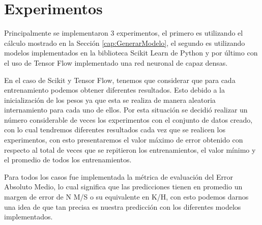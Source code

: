 \section{Experimentos}

Principalmente se implementaron 3 experimentos, el primero es utilizando el cálculo mostrado en la Sección \ref{cap:GenerarModelo}, el segundo es utilizando modelos implementados en la biblioteca Scikit Learn de Python y por último con el uso de Tensor Flow implementado una red neuronal de capaz densas.

En el caso de Scikit y Tensor Flow, tenemos que considerar que para cada entrenamiento podemos obtener diferentes resultados. Esto debido a la inicialización de los pesos ya que esta se realiza de manera aleatoria internamiento para cada uno de ellos. Por esta situación se decidió realizar un número considerable de veces los experimentos con el conjunto de datos creado, con lo cual tendremos diferentes resultados cada vez que se realicen los experimentos, con esto presentaremos el valor máximo de error obtenido con respecto al total de veces que se repitieron los entrenamientos, el valor mínimo y el promedio de todos los entrenamientos.

Para todos los casos fue implementada la métrica de evaluación del Error Absoluto Medio, lo cual significa que las predicciones tienen en promedio un margen de error de N M/S o su equivalente en K/H, con esto podemos darnos una idea de que tan precisa es nuestra predicción con los diferentes modelos implementados.

